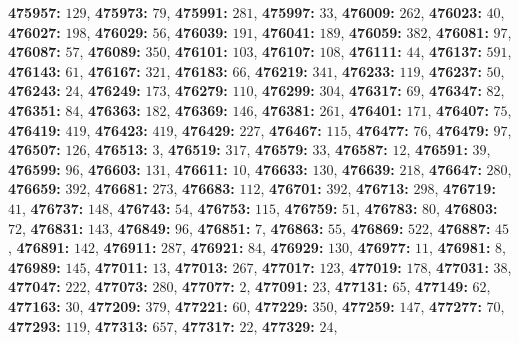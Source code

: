 \textsf{\bfseries 475957:} $129$, \textsf{\bfseries 475973:} $79$, \textsf{\bfseries 475991:} $281$, \textsf{\bfseries 475997:} $33$, \textsf{\bfseries 476009:} $262$, \textsf{\bfseries 476023:} $40$, \textsf{\bfseries 476027:} $198$, \textsf{\bfseries 476029:} $56$, \textsf{\bfseries 476039:} $191$, \textsf{\bfseries 476041:} $189$, \textsf{\bfseries 476059:} $382$, \textsf{\bfseries 476081:} $97$, \textsf{\bfseries 476087:} $57$, \textsf{\bfseries 476089:} $350$, \textsf{\bfseries 476101:} $103$, \textsf{\bfseries 476107:} $108$, \textsf{\bfseries 476111:} $44$, \textsf{\bfseries 476137:} $591$, \textsf{\bfseries 476143:} $61$, \textsf{\bfseries 476167:} $321$, \textsf{\bfseries 476183:} $66$, \textsf{\bfseries 476219:} $341$, \textsf{\bfseries 476233:} $119$, \textsf{\bfseries 476237:} $50$, \textsf{\bfseries 476243:} $24$, \textsf{\bfseries 476249:} $173$, \textsf{\bfseries 476279:} $110$, \textsf{\bfseries 476299:} $304$, \textsf{\bfseries 476317:} $69$, \textsf{\bfseries 476347:} $82$, \textsf{\bfseries 476351:} $84$, \textsf{\bfseries 476363:} $182$, \textsf{\bfseries 476369:} $146$, \textsf{\bfseries 476381:} $261$, \textsf{\bfseries 476401:} $171$, \textsf{\bfseries 476407:} $75$, \textsf{\bfseries 476419:} $419$, \textsf{\bfseries 476423:} $419$, \textsf{\bfseries 476429:} $227$, \textsf{\bfseries 476467:} $115$, \textsf{\bfseries 476477:} $76$, \textsf{\bfseries 476479:} $97$, \textsf{\bfseries 476507:} $126$, \textsf{\bfseries 476513:} $3$, \textsf{\bfseries 476519:} $317$, \textsf{\bfseries 476579:} $33$, \textsf{\bfseries 476587:} $12$, \textsf{\bfseries 476591:} $39$, \textsf{\bfseries 476599:} $96$, \textsf{\bfseries 476603:} $131$, \textsf{\bfseries 476611:} $10$, \textsf{\bfseries 476633:} $130$, \textsf{\bfseries 476639:} $218$, \textsf{\bfseries 476647:} $280$, \textsf{\bfseries 476659:} $392$, \textsf{\bfseries 476681:} $273$, \textsf{\bfseries 476683:} $112$, \textsf{\bfseries 476701:} $392$, \textsf{\bfseries 476713:} $298$, \textsf{\bfseries 476719:} $41$, \textsf{\bfseries 476737:} $148$, \textsf{\bfseries 476743:} $54$, \textsf{\bfseries 476753:} $115$, \textsf{\bfseries 476759:} $51$, \textsf{\bfseries 476783:} $80$, \textsf{\bfseries 476803:} $72$, \textsf{\bfseries 476831:} $143$, \textsf{\bfseries 476849:} $96$, \textsf{\bfseries 476851:} $7$, \textsf{\bfseries 476863:} $55$, \textsf{\bfseries 476869:} $522$, \textsf{\bfseries 476887:} $45$, \textsf{\bfseries 476891:} $142$, \textsf{\bfseries 476911:} $287$, \textsf{\bfseries 476921:} $84$, \textsf{\bfseries 476929:} $130$, \textsf{\bfseries 476977:} $11$, \textsf{\bfseries 476981:} $8$, \textsf{\bfseries 476989:} $145$, \textsf{\bfseries 477011:} $13$, \textsf{\bfseries 477013:} $267$, \textsf{\bfseries 477017:} $123$, \textsf{\bfseries 477019:} $178$, \textsf{\bfseries 477031:} $38$, \textsf{\bfseries 477047:} $222$, \textsf{\bfseries 477073:} $280$, \textsf{\bfseries 477077:} $2$, \textsf{\bfseries 477091:} $23$, \textsf{\bfseries 477131:} $65$, \textsf{\bfseries 477149:} $62$, \textsf{\bfseries 477163:} $30$, \textsf{\bfseries 477209:} $379$, \textsf{\bfseries 477221:} $60$, \textsf{\bfseries 477229:} $350$, \textsf{\bfseries 477259:} $147$, \textsf{\bfseries 477277:} $70$, \textsf{\bfseries 477293:} $119$, \textsf{\bfseries 477313:} $657$, \textsf{\bfseries 477317:} $22$, \textsf{\bfseries 477329:} $24$, 
